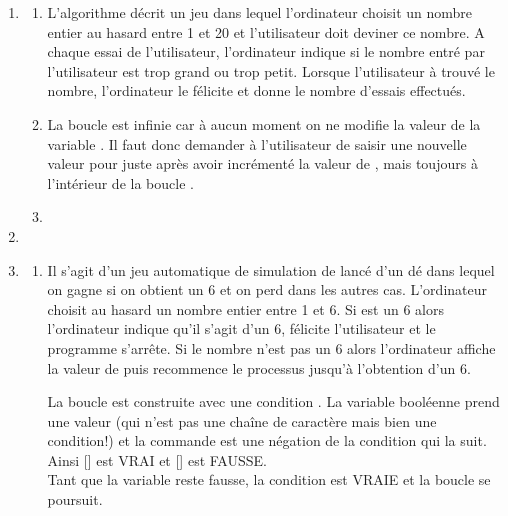 \begin{enumerate}[label=\thechapter.\arabic*., font=\bfseries, itemsep=10mm,labelsep*=3mm,left=0mm]
\item
\begin{enumerate}[label=\alph*),itemsep=2mm]
\item L'algorithme décrit un jeu dans lequel l'ordinateur choisit un nombre entier au hasard entre 1 et 20 et l'utilisateur doit deviner ce nombre. A chaque essai de l'utilisateur, l'ordinateur indique si le nombre entré par l'utilisateur est trop grand ou trop petit. Lorsque l'utilisateur à trouvé le nombre, l'ordinateur le félicite et donne le nombre d'essais effectués.
\item La boucle  est infinie car à aucun moment on ne modifie la valeur de la variable . Il faut donc demander à l'utilisateur de saisir une nouvelle valeur pour  juste après avoir incrémenté la valeur de , mais toujours à l'intérieur de la boucle .
\item 
\begin{minipage}[t][][b]{1\textwidth}
\end{minipage}
\end{enumerate}



\item \begin{minipage}[t][][b]{1\textwidth}\vspace{-3mm}
\end{minipage}



\item
\begin{enumerate}[label=\alph*),itemsep=2mm]
\item Il s'agit d'un jeu automatique de simulation de lancé d'un dé dans lequel on gagne si on obtient un 6 et on perd dans les autres cas. L'ordinateur choisit au hasard un nombre entier  entre 1 et 6. %
Si  est un 6 alors l'ordinateur indique qu'il s'agit d'un 6, félicite l'utilisateur et le programme s'arrête. Si le nombre  n'est pas un 6 alors l'ordinateur affiche la valeur de  puis recommence le processus jusqu'à l'obtention d'un 6.

\smallskip
La boucle  est construite avec une condition . La variable booléenne  prend une valeur  (qui n'est pas une chaîne de caractère mais bien une condition!) et la commande  est une négation de la condition qui la suit. Ainsi [] est VRAI et [] est FAUSSE.\\
Tant que la variable  reste fausse, la condition  est VRAIE et la boucle se poursuit.


\end{enumerate}
\end{enumerate}
